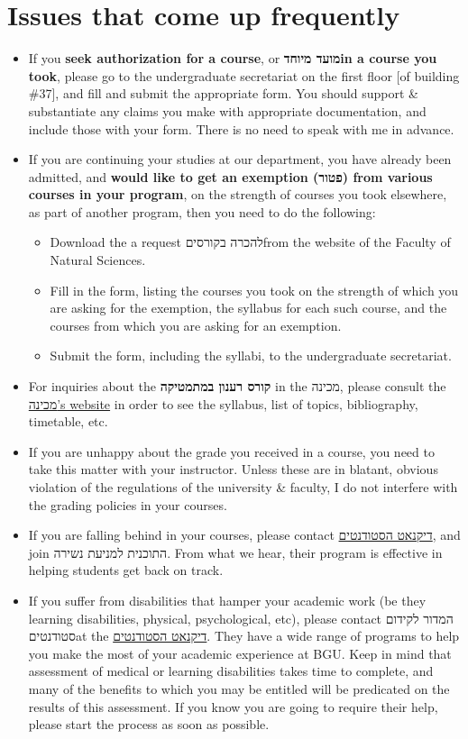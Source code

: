 \documentclass[11pt]{article}
\begin{document}
\section{Issues that come up frequently}
\label{sec:orgb103d49}

\begin{itemize}
\item If you \textbf{seek authorization for a course}, or \textbf{מועד מיוחדin a course you took}, please go to the undergraduate secretariat on the first floor [of building \#37], and fill and submit the appropriate form. You should support \& substantiate any claims you make with appropriate documentation, and include those with your form. There is no need to speak with me in advance.
\item If you are continuing your studies at our department, you have already been admitted, and \textbf{would like to get an exemption (פטור) from various courses in your program}, on the strength of courses you took elsewhere, as part of another program, then you need to do the following:
\begin{itemize}
\item Download the a request להכרה בקורסיםfrom the website of the Faculty of Natural Sciences.
\item Fill in the form, listing the courses you took on the strength of which you are asking for the exemption, the syllabus for each such course, and the courses from which you are asking for an exemption.
\item Submit the form, including the syllabi, to the undergraduate secretariat.
\end{itemize}
\item For inquiries about the \textbf{קורס רענון במתמטיקה} in the מכינה, please consult the \href{http://in.bgu.ac.il/acadsec/preacad/Pages/accepted.aspx}{מכינה's website} in order to see the syllabus, list of topics, bibliography, timetable, etc.
\item If you are unhappy about the grade you received in a course, you need to take this matter with your instructor. Unless these are in blatant, obvious violation of the regulations of the university \& faculty, I do not interfere with the grading policies in your courses.
\item If you are falling behind in your courses, please contact \href{http://in.bgu.ac.il/Dekanat/Pages/default.aspx}{דיקנאט הסטודנטים}, and join התוכנית למניעת נשירה. From what we hear, their program is effective in helping students get back on track.
\item If you suffer from disabilities that hamper your academic work (be they learning disabilities, physical, psychological, etc), please contact המדור לקידום סטודנטיםat the \href{http://in.bgu.ac.il/Dekanat/Pages/default.aspx}{דיקנאט הסטודנטים}. They have a wide range of programs to help you make the most of your academic experience at BGU. Keep in mind that assessment of medical or learning disabilities takes time to complete, and many of the benefits to which you may be entitled will be predicated on the results of this assessment. If you know you are going to require their help, please start the process as soon as possible.

\end{itemize}
\end{document}
